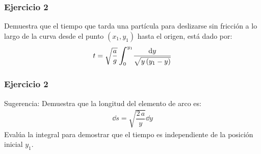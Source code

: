 \documentclass[12pt]{beamer}
\begin{document}
\begin{frame}
\frametitle{Ejercicio 2}
Demuestra que el tiempo que tarda una partícula para deslizarse sin fricción a lo largo de la curva desde el punto $(x_{1}, y_{1})$ hasta el origen, está dado por:
\begin{align*}
t = \sqrt{\dfrac{a}{g}} \, \scaleint{6ex}_{\bs 0}^{y_{1}} \dfrac{\dd{y}}{\sqrt{y \, (y_{1}- y)}}
\end{align*}
\end{frame}
\begin{frame}
\frametitle{Ejercicio 2}
Sugerencia: Demuestra que la longitud del elemento de arco es:
\begin{align*}
\dd{s} = \sqrt{\dfrac{2 \, a}{y}} \dd{y}
\end{align*}
Evalúa la integral para demostrar que el tiempo es independiente de la posición inicial $y_{1}$.
\end{frame}
\end{document}
